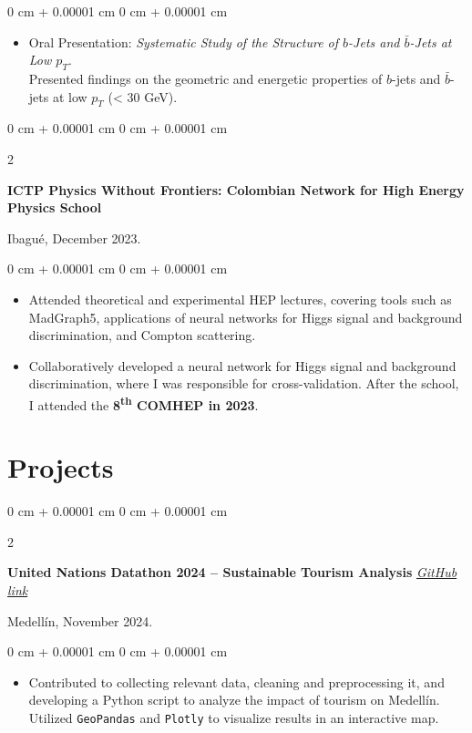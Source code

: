 \documentclass[10pt, letterpaper]{article}
\newenvironment{highlights}{
    \begin{itemize}[
        topsep=0.10 cm,
        parsep=0.10 cm,
        partopsep=0pt,
        itemsep=0pt,
        leftmargin=0 cm + 10pt
    ]
}{
    \end{itemize}
}
\newenvironment{onecolentry}{
    \begin{adjustwidth}{
        0 cm + 0.00001 cm
    }{
        0 cm + 0.00001 cm
    }
}{
    \end{adjustwidth}
}
\newenvironment{twocolentry}[2][]{
    \onecolentry
    \def\secondColumn{#2}
    \setcolumnwidth{\fill, 4.5 cm}
    \begin{paracol}{2}
}{
    \switchcolumn \raggedleft \secondColumn
    \end{paracol}
    \endonecolentry
}
\begin{document}
    \vspace{0.10 cm}
    \begin{onecolentry}
        \begin{highlights}
            \item Oral Presentation: \textit{Systematic Study of the Structure of \(b\)-Jets and \(\bar{b}\)-Jets at Low \(p_T\)}. \\
            Presented findings on the geometric and energetic properties of \(b\)-jets and \(\bar{b}\)-jets at low \(p_T\) (< 30 GeV).
        \end{highlights}
    \end{onecolentry}

    \vspace{0.2 cm}
    \begin{twocolentry}{
        Ibagué, December 2023.
    }
        \textbf{ICTP Physics Without Frontiers: Colombian Network for High Energy Physics School}
    \end{twocolentry}

    \vspace{0.10 cm}
    \begin{onecolentry}
        \begin{highlights}
            \item Attended theoretical and experimental HEP lectures, covering tools such as MadGraph5, applications of neural networks for Higgs signal and background discrimination, and Compton scattering.
            \item Collaboratively developed a neural network for Higgs signal and background discrimination, where I was responsible for cross-validation. After the school, I attended the \textbf{8\textsuperscript{th} COMHEP in 2023}.
        \end{highlights}
    \end{onecolentry}

    \section{Projects}
    \begin{twocolentry}{
        Medellín, November 2024.
    }
        \textbf{United Nations Datathon 2024 -- Sustainable Tourism Analysis} 
        \textit{\href{https://github.com/JuanJ27/UN-Datathon-sisifos}{GitHub link}}
    \end{twocolentry}

    \vspace{0.10 cm}
    \begin{onecolentry}
        \begin{highlights}
            \item Contributed to collecting relevant data, cleaning and preprocessing it, and developing a Python script to analyze the impact of tourism on Medellín. Utilized \texttt{GeoPandas} and \texttt{Plotly} to visualize results in an interactive map.
        \end{highlights}
    \end{onecolentry}
\end{document}

